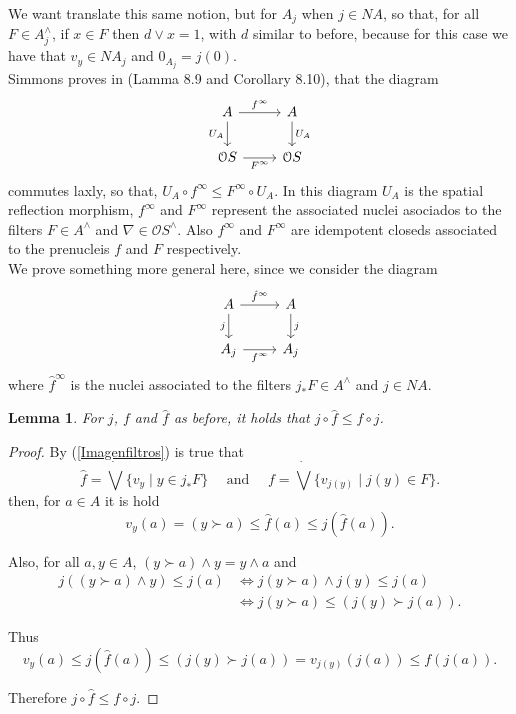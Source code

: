 \documentclass[11pt]{amsart}
\theoremstyle{plain}
\newtheorem{lem}[thm]{Lemma}
\theoremstyle{definition}
\begin{document}
We want translate this same notion, but for $A_j$ when $j\in NA$, so that, for all $F\in A_j^\wedge$, if $x\in F$ then $d\vee x=1$, with $d$ similar to before, because for this case we have that $v_y\in NA_j$ and $0_{A_j}=j(0)$.\\

Simmons proves in \cite{H.S.(V)} (Lamma 8.9 and Corollary 8.10), that the diagram
\[\begin{tikzcd}
	A & A \\
	{\mathcal{O}S} & {\mathcal{O}S}
	\arrow["{f^\infty}", from=1-1, to=1-2]
	\arrow["{U_A}"', from=1-1, to=2-1]
	\arrow["{U_A}", from=1-2, to=2-2]
	\arrow["{F^\infty}"', from=2-1, to=2-2]
\end{tikzcd}\]
commutes laxly, so that, $U_A\circ f^\infty\leq F^\infty \circ U_A$. In this diagram $U_A$ is the spatial reflection morphism, $f^\infty$ and $F^\infty$ represent the associated nuclei asociados to the filters $F\in A^\wedge$ and $\nabla\in \mathcal{O}S^\wedge$. Also $f^\infty$ and $F^\infty$ are idempotent closeds associated to the prenucleis $f$ and $F$ respectively.\\

We prove something more general here, since we consider the diagram
\[\begin{tikzcd}
	A & A \\
	{A_j} & {A_j}
	\arrow["{\hat{f}^\infty}", from=1-1, to=1-2]
	\arrow["j"', from=1-1, to=2-1]
	\arrow["j", from=1-2, to=2-2]
	\arrow["{f^\infty}"', from=2-1, to=2-2]
\end{tikzcd}\]
where $\hat{f}^\infty$ is the nuclei associated to the filters $j_*F\in A^\wedge$ and $j\in NA$.  

\begin{lem}\label{f1f}
    For $j$, $f$ and $\hat{f}$ as before, it holds that $j\circ \hat{f}\leq f\circ j$.
\end{lem}
\begin{proof}
    By (\ref{Imagenfiltros}) is true that
    \[
    \hat{f}=\dot{\bigvee}\{v_y\mid y\in j_*F\}\quad  \mbox{ and } \quad f=\dot{\bigvee}\{v_{j(y)}\mid j(y)\in F\}. 
    \]
then, for $a\in A$ it is hold
\[
v_y(a)=(y\succ a)\leq \hat{f}(a)\leq j(\hat{f}(a)).
\]

Also, for all $a, y\in A$, $(y\succ a)\wedge y=y\wedge a$ and
\[
\begin{split}
j((y\succ a)\wedge y)\leq j(a) & \Leftrightarrow j(y\succ a)\wedge j(y)\leq j(a)\\
& \Leftrightarrow j(y\succ a)\leq (j(y)\succ j(a)).
\end{split}
\]

Thus 
\[
v_y(a)\leq j(\hat{f}(a))\leq (j(y)\succ j(a))=v_{j(y)}(j(a))\leq f(j(a)).
\]

Therefore $j\circ \hat{f}\leq f\circ j$.
\end{proof}
\end{document}
